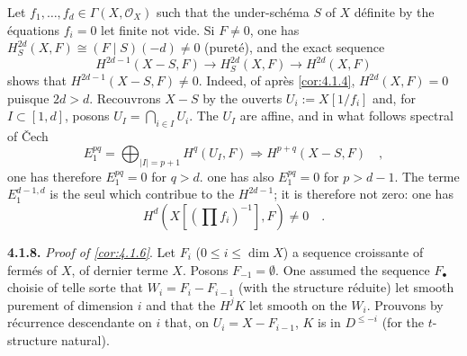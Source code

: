 \documentclass[12pt,a4paper]{article}
\theoremstyle{plain}
\theoremstyle{definition}
\newcommand{\cO}{\mathcal{O}}
\providecommand{\cO}{\mathcal{O}}
\begin{document}
Let $f_{1},\ldots,f_{d} \in \Gamma(X,\cO_{X})$ such that the under-sch\'{e}ma $S$ of $X$ d\'{e}finite by the \'{e}quations $f_{i} = 0$ let finite not vide. Si $F \neq 0$, one has $H^{2d}_{S}(X,F) \cong (F \mid S)(-d) \neq 0$ (puret\'{e}), and the exact sequence
\[
H^{2d-1}(X-S,F) \longrightarrow H^{2d}_{S}(X,F) \longrightarrow H^{2d}(X,F)
\]
shows that $H^{2d-1}(X-S,F) \neq 0$. Indeed, of apr\`{e}s \ref{cor:4.1.4}, $H^{2d}(X,F) = 0$ puisque $2d > d$. Recouvrons $X-S$ by the ouverts $U_{i} := X[1/f_{i}]$ and, for $I \subset [1,d]$, posons $U_{I} = \bigcap_{i \in I} U_{i}$. The $U_{I}$ are affine, and in what follows spectral of \v{C}ech
\[
E_{1}^{pq} = \bigoplus_{|I|=p+1} H^{q}(U_{I},F) \Rightarrow H^{p+q}(X-S,F)\quad,
\]
one has therefore $E_{1}^{pq} = 0$ for $q > d$. one has also $E_{1}^{pq} = 0$ for $p > d-1$. The terme $E_{1}^{d-1,d}$ is the seul which contribue to the $H^{2d-1}$; it is therefore not zero: one has
\[
H^{d}(X[(\prod f_{i})^{-1}], F) \neq 0\quad.
\]

\noindent\textbf{4.1.8.} \emph{Proof of \ref{cor:4.1.6}}. Let $F_{i}$ ($0 \leq i \leq \dim X$) a sequence croissante of ferm\'{e}s of $X$, of dernier terme $X$. Posons $F_{-1} = \emptyset$. One assumed the sequence $F_{\bullet}$ choisie of telle sorte that $W_{i} = F_{i} - F_{i-1}$ (with the structure r\'{e}duite) let smooth purement of dimension $i$ and that the $H^{j}K$ let smooth on the $W_{i}$. Prouvons by r\'{e}currence descendante on $i$ that, on $U_{i} = X - F_{i-1}$, $K$ is in $D^{\leq -i}$ (for the $t$-structure natural).
\end{document}
